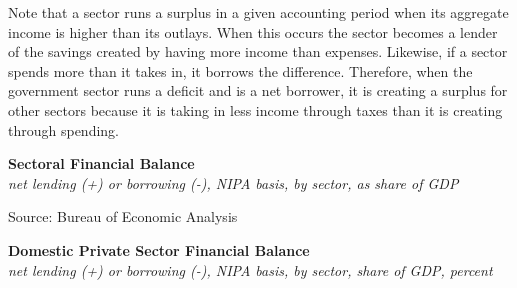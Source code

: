 \documentclass{report}
\makeatletter
\newcommand{\tbllink}[1]{\href{https://raw.githubusercontent.com/bdecon/US-chartbook/master/chartbook/data/#1}{\faTable}}
\newcommand*\short[1]{\expandafter\@gobbletwo\number\numexpr#1\relax}
\newcommand{\sbar}[4]{
		\addplot[ybar stacked, bar width=2.45pt, draw opacity=0, fill=#1] 
			table [x=#2, y=#3, col sep=comma]{#4};}
\newcommand{\dateaxisticks}{
		date coordinates in=x, axis line style={draw=none},
		xmax={2022-03-15},
		max space between ticks=40,	    
		xtick={{1990-01-01}, {1992-01-01}, {1994-01-01}, 
			{1996-01-01}, {1998-01-01}, {2000-01-01}, 
			{2002-01-01}, {2004-01-01}, {2006-01-01},
			{2008-01-01}, {2010-01-01}, {2012-01-01}, {2014-01-01},
		    {2016-01-01}, {2018-01-01}, {2020-01-01}, {2022-01-01}, 
		    {2024-01-01}, {2026-01-01}},
		minor xtick={{1989-01-01}, {1991-01-01}, {1993-01-01},
			{1995-01-01}, {1997-01-01}, {1999-01-01}, 
			{2001-01-01}, {2003-01-01}, {2005-01-01}, {2007-01-01},
		    {2009-01-01}, {2011-01-01}, {2013-01-01}, {2015-01-01},
		    {2017-01-01}, {2019-01-01}, {2021-01-01}, {2023-01-01}, 
		    {2025-01-01}, {2027-01-01}},
		enlarge y limits={0.06}, enlarge x limits={0.01},
		}
\newcommand{\bbar}[2]{extra #1 ticks = {{#2}}, extra #1 tick labels = ,
		extra #1 tick style = {grid=major, grid style={thick, black!25}},}
\newcommand{\rbars}{
		\fill[color=black!10] (axis cs:{1990-07-01},\pgfkeysvalueof{/pgfplots/ymin}) rectangle 
			(axis cs:{1991-03-01}, \pgfkeysvalueof{/pgfplots/ymax});
		\fill[color=black!10] (axis cs:{2007-12-01},\pgfkeysvalueof{/pgfplots/ymin}) rectangle 
			(axis cs:{2009-07-01}, \pgfkeysvalueof{/pgfplots/ymax});
		\fill[color=black!10] (axis cs:{2001-03-01},\pgfkeysvalueof{/pgfplots/ymin}) rectangle 
			(axis cs:{2001-11-01}, \pgfkeysvalueof{/pgfplots/ymax});
		\fill[color=black!10] (axis cs:{2020-02-01},\pgfkeysvalueof{/pgfplots/ymin}) rectangle 
			(axis cs:{2020-05-01}, \pgfkeysvalueof{/pgfplots/ymax});}
\makeatother
\begin{document}
{\begin{minipage}{0.76\textwidth}
Note that a sector runs a surplus in a given accounting period when its aggregate income is higher than its outlays. When this occurs the sector becomes a lender of the savings created by having more income than expenses. Likewise, if a sector spends more than it takes in, it borrows the difference. Therefore, when the government sector runs a deficit and is a net borrower, it is creating a surplus for other sectors because it is taking in less income through taxes than it is creating through spending. 
\vspace{1mm}

\normalsize \textbf{Sectoral Financial Balance}\\
\footnotesize{\textit{net lending (+) or borrowing (-), NIPA basis, by sector, as share of GDP}}
\vspace{3.8cm}

\hspace{4mm} 

\footnotesize{Source: Bureau of Economic Analysis} \hfill \tbllink{sectbal.csv} 
\vspace{3mm}

\small  


\vspace{1mm}

\normalsize \textbf{Domestic Private Sector Financial Balance}\\
\footnotesize{\textit{net lending (+) or borrowing (-), NIPA basis, by sector, share of GDP, percent}}
\vspace{2.6cm}


\end{minipage}}
\end{document}
